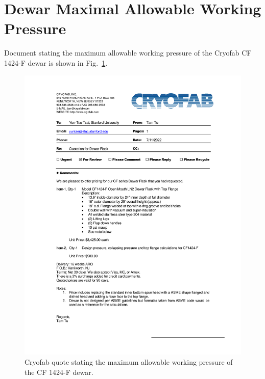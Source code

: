 \section{Dewar Maximal Allowable Working Pressure}
\label{app:mawp_statement}

Document stating the maximum allowable working pressure
of the Cryofab CF 1424-F dewar is shown in Fig.~\ref{fig:mawp}.

\begin{figure}[h]
    \centering
    \includegraphics[height=0.73\textheight]{fig/CryofabCF1424FQuote.pdf}
    \caption{Cryofab quote stating the maximum allowable working
    pressure of the CF 1424-F dewar.}
    \label{fig:mawp}
\end{figure}